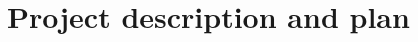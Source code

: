 \documentclass[USenglish]{ttm4502}
\begin{document}


\section{Project description and plan}
\label{sec:project_description_and_plan}

  


\end{document}
